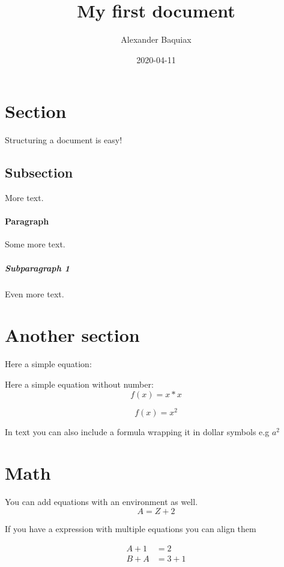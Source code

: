 \documentclass{article}
\title{My first document}
\date{2020-04-11}
\author{Alexander Baquiax}
\begin{document}
\maketitle
\newpage
{}

\section{Section}
Structuring a document is easy!

\subsection{Subsection}
More text.

\paragraph{Paragraph}
Some more text.

\subparagraph{Subparagraph 1}
Even more text.

\section{Another section}

Here a simple equation:

Here a simple equation without number:
\begin{equation*}
    f(x) = x*x
\end{equation*}

\begin{equation}
    f(x) = x^2
\end{equation}

In text you can also include a formula wrapping it in dollar symbols e.g $a^2$

\section{Math}
You can add equations with an environment as well.
\begin{equation}
    A = Z + 2
\end{equation}

If you have a expression with multiple equations you can align them

\begin{align}
    A + 1 & = 2     \\ %
    B + A & = 3 + 1 %
\end{align}
\end{document}
